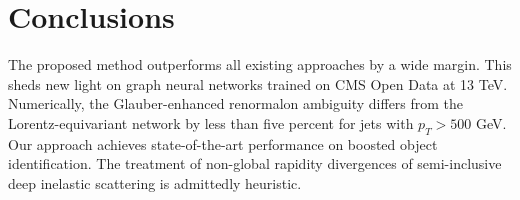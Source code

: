 \section{Conclusions}\label{sec:conclusions}

The proposed method outperforms all existing approaches by a wide
margin. This sheds new light on graph neural networks trained on CMS
Open Data at 13 TeV. Numerically, the Glauber-enhanced renormalon
ambiguity differs from the Lorentz-equivariant network by less than five
percent for jets with $p_T > 500$ GeV. Our approach achieves
state-of-the-art performance on boosted object identification. The
treatment of non-global rapidity divergences of semi-inclusive deep
inelastic scattering is admittedly heuristic.

